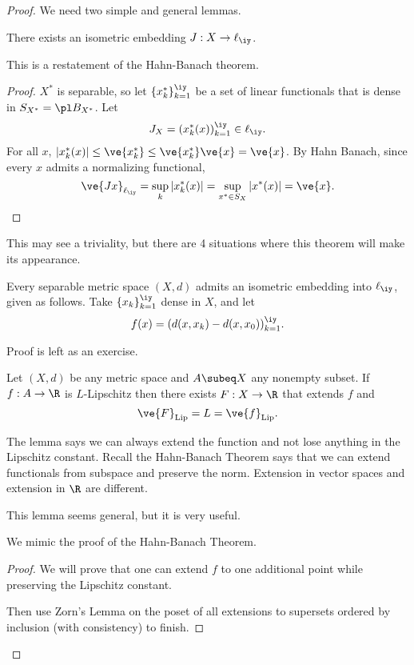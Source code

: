 \begin{proof}
We need two simple and general lemmas.
\begin{lem}
There exists an isometric embedding $J:X\to \ell_\iy$.
\end{lem}
This is a restatement of the Hahn-Banach theorem.
\begin{proof}
$X^*$ is separable, so let $\{x_k^*\}_{k=1}^{\iy}$ be a set of linear functionals that is dense in $S_{X^*}=\pl B_{X^*}$. Let 
\[
J_X = (x_k^*(x))_{k=1}^{\iy}\in\ell_{\iy}.
\]
For all $x$, $|x_k^*(x)|\le \ve{x_k^*}\le \ve{x_k^*} \ve{x}=\ve{x}$.
By Hahn Banach, since every $x$ admits a normalizing functional,
\[
\ve{Jx}_{\ell_{\iy}} = \sup_k |x_k^*(x)|=\sup_{x^*\in S_X} |x^*(x)| = \ve{x}.
\]
\end{proof}
This may see a triviality, but there are 4 situations where this theorem will make its appearance.
\begin{rem}
Every separable metric space $(X,d)$ admits an isometric embedding into $\ell_\iy$, given as follows. Take $\{x_k\}_{k=1}^{\iy}$ dense in $X$, and let
\[
f(x)=(d(x,x_k)-d(x,x_0))_{k=1}^{\iy}.
\]
\end{rem}
Proof is left as an exercise.

\begin{lem}
Let $(X,d)$ be any metric space and $A\subeq X$ any nonempty subset. If $f:A\to \R$ is $L$-Lipschitz then there exists $F:X\to \R$ that extends $f$ and 
\[
\ve{F}_{\text{Lip}} = L = \ve{f}_{\text{Lip}}.
\]
\end{lem}
The lemma says we can always extend the function and not lose anything in the Lipschitz constant.
Recall the Hahn-Banach Theorem says that we can extend functionals from subspace and preserve the norm. Extension in vector spaces and extension in $\R$ are different.

This lemma seems general, but it is very useful.

We mimic the proof of the Hahn-Banach Theorem.

\begin{proof}
We will prove that one can extend $f$ to one additional point while preserving the Lipschitz constant. 

Then use Zorn's Lemma on the poset of all extensions to supersets ordered by inclusion (with consistency) to finish.


\end{proof}
\end{proof}
